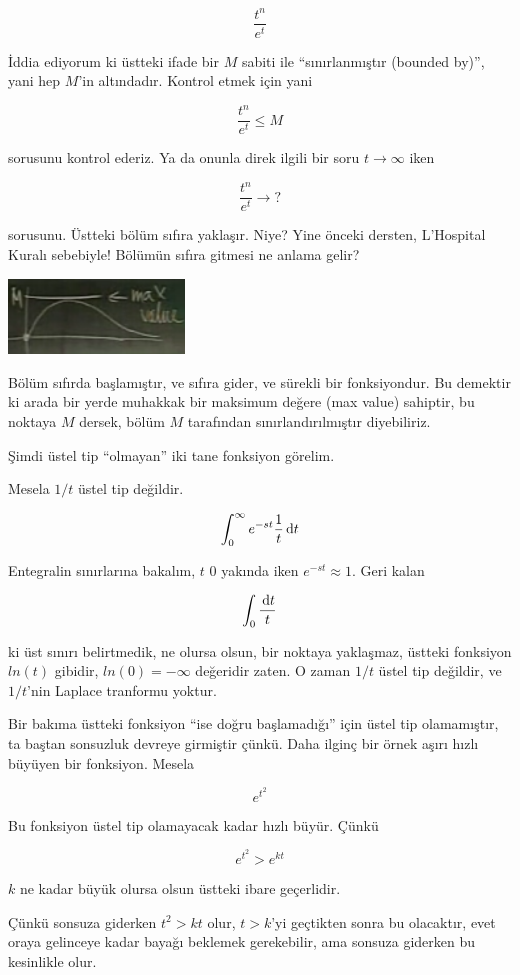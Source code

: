 \documentclass[12pt,fleqn]{article}\usepackage{../../common}
\begin{document}
$$ \frac{t^n}{e^t} $$

İddia ediyorum ki üstteki ifade bir $M$ sabiti ile ``sınırlanmıştır
(bounded by)'', yani hep $M$'in altındadır. Kontrol etmek için yani

$$ \frac{t^n}{e^t} \le  M$$

sorusunu kontrol ederiz. Ya da onunla direk ilgili bir soru  $t \to \infty$ iken

$$ \frac{t^n}{e^t} \to ?$$

sorusunu. Üstteki bölüm sıfıra yaklaşır. Niye? Yine önceki dersten,
L'Hospital Kuralı sebebiyle! Bölümün sıfıra gitmesi ne anlama gelir? 

\includegraphics[height=2cm]{20_1.png}

Bölüm sıfırda başlamıştır, ve sıfıra gider, ve sürekli bir fonksiyondur. Bu
demektir ki arada bir yerde muhakkak bir maksimum değere (max value)
sahiptir, bu noktaya $M$ dersek, bölüm $M$ tarafından sınırlandırılmıştır
diyebiliriz.

Şimdi üstel tip ``olmayan'' iki tane fonksiyon görelim. 

Mesela $1/t$ üstel tip değildir. 

$$ \int_0^{\infty} e^{-st}\frac{1}{t} \,\mathrm{d} t  $$

Entegralin sınırlarına bakalım, $t$ 0 yakında iken $e^{-st} \approx
1$. Geri kalan

$$ \int_0 \frac{\,\mathrm{d} t}{t} $$

ki üst sınırı belirtmedik, ne olursa olsun, bir noktaya yaklaşmaz, üstteki
fonksiyon $ln(t)$ gibidir, $ln(0)=-\infty$ değeridir zaten. O zaman $1/t$
üstel tip değildir, ve $1/t$'nin Laplace tranformu yoktur. 

Bir bakıma üstteki fonksiyon ``ise doğru başlamadığı'' için üstel tip
olamamıştır, ta baştan sonsuzluk devreye girmiştir çünkü. Daha ilginç bir
örnek aşırı hızlı büyüyen bir fonksiyon. Mesela

$$ e^{t^2} $$

Bu fonksiyon üstel tip olamayacak kadar hızlı büyür. Çünkü 

$$ e^{t^2} > e^{kt} $$

$k$ ne kadar büyük olursa olsun üstteki ibare geçerlidir. 

Çünkü sonsuza giderken $t^2 > kt$ olur, $t>k$'yi geçtikten sonra bu
olacaktır, evet oraya gelinceye kadar bayağı beklemek gerekebilir, ama
sonsuza giderken bu kesinlikle olur.
\end{document}
